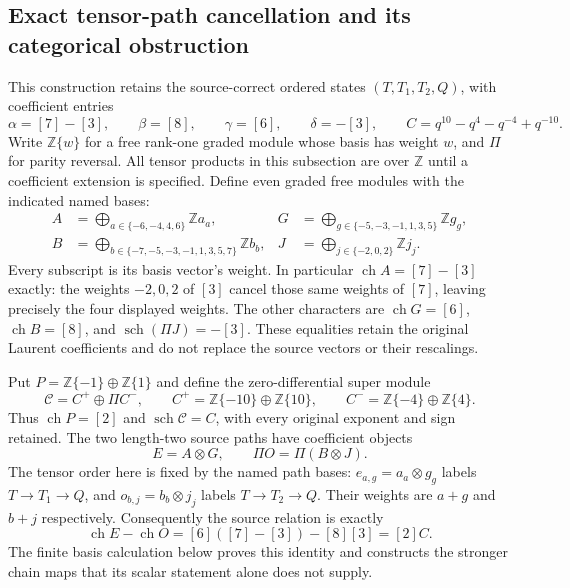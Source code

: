 \subsection{Exact tensor-path cancellation and its categorical obstruction}
\label{subsec:fgb-path-cancellation}

This construction retains the source-correct ordered states
$(T,T_1,T_2,Q)$, with coefficient entries
\[
 \alpha=[7]-[3],\qquad \beta=[8],\qquad
 \gamma=[6],\qquad \delta=-[3],\qquad
 C=q^{10}-q^4-q^{-4}+q^{-10}.
\]
Write $\mathbb Z\{w\}$ for a free rank-one graded module whose basis
has weight $w$, and $\Pi$ for parity reversal. All tensor products in
this subsection are over $\mathbb Z$ until a coefficient extension is
specified. Define even graded free modules with the indicated named bases:
\begin{align*}
 A&=\bigoplus_{a\in\{-6,-4,4,6\}}\mathbb Z a_a,&
 G&=\bigoplus_{g\in\{-5,-3,-1,1,3,5\}}\mathbb Z g_g,\\
 B&=\bigoplus_{b\in\{-7,-5,-3,-1,1,3,5,7\}}\mathbb Z b_b,&
 J&=\bigoplus_{j\in\{-2,0,2\}}\mathbb Z j_j.
\end{align*}
Every subscript is its basis vector's weight. In particular
$\operatorname{ch}A=[7]-[3]$ exactly: the weights $-2,0,2$ of $[3]$
cancel those same weights of $[7]$, leaving precisely the four displayed
weights. The other characters are $\operatorname{ch}G=[6]$,
$\operatorname{ch}B=[8]$, and
$\operatorname{sch}(\Pi J)=-[3]$.
These equalities retain the original Laurent coefficients and do not
replace the source vectors or their rescalings.

Put $P=\mathbb Z\{-1\}\oplus\mathbb Z\{1\}$ and define the
zero-differential super module
\[
 \mathcal C=C^+\oplus\Pi C^-,\qquad
 C^+=\mathbb Z\{-10\}\oplus\mathbb Z\{10\},\qquad
 C^-=\mathbb Z\{-4\}\oplus\mathbb Z\{4\}.
\]
Thus $\operatorname{ch}P=[2]$ and
$\operatorname{sch}\mathcal C=C$, with every original exponent and sign
retained. The two length-two source paths have coefficient objects
\[
 E=A\otimes G,\qquad \Pi O=\Pi(B\otimes J).
\]
The tensor order here is fixed by the named path bases: $e_{a,g}=a_a\otimes
g_g$ labels $T\to T_1\to Q$, and $o_{b,j}=b_b\otimes j_j$ labels
$T\to T_2\to Q$. Their weights are $a+g$ and $b+j$ respectively.
Consequently the source relation is exactly
\begin{equation}\label{eq:fgb-path-euler}
 \operatorname{ch}E-\operatorname{ch}O
 =[6]([7]-[3])-[8][3]=[2]C.
\end{equation}
The finite basis calculation below proves this identity and constructs
the stronger chain maps that its scalar statement alone does not supply.

